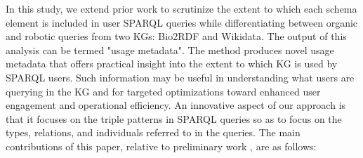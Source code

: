 \documentclass[sw]{iosart2x}
\begin{document}
In this study, we extend prior work \cite{mohammadi2024analyzing} to scrutinize the extent to which each schema element is included in user SPARQL queries while differentiating between organic and robotic queries from two KGs: Bio2RDF and Wikidata. The output of this analysis can be termed "usage metadata". The method produces novel usage metadata that offers practical insight into the extent to which KG is used by SPARQL users. Such information may be useful in understanding what users are querying in the KG and for targeted optimizations toward enhanced user engagement and operational efficiency. 
An innovative aspect of our approach is that it focuses on the triple patterns in SPARQL queries so as to focus on the types, relations, and individuals referred to in the queries. The main contributions of this paper, relative to preliminary work \cite{mohammadi2024analyzing}, are as follows:
\end{document}

